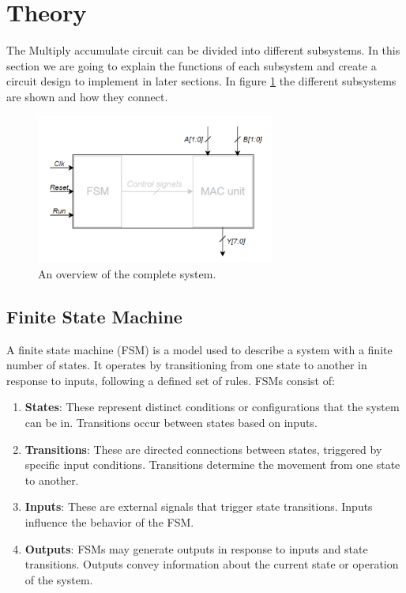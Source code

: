 \newpage
\section{Theory}
\label{sec:theory}

The Multiply accumulate circuit can be divided into different subsystems. In this section we are going to explain the functions of each subsystem and create a circuit design to implement in later sections. In figure \ref{fig:blokk} the different subsystems are shown and how they connect. 

\begin{figure}[H]
    \centering
    \includegraphics[width=0.7\textwidth]{Figures/Blokk.png}
    \caption{An overview of the complete system.}
    \label{fig:blokk}
\end{figure}


\subsection{Finite State Machine}
\label{subsec:fsm_theory}

A finite state machine (FSM) is a model used to describe a system with a finite number of states. It operates by transitioning from one state to another in response to inputs, following a defined set of rules. FSMs consist of:

\begin{enumerate}
    \item \textbf{States}: These represent distinct conditions or configurations that the system can be in. Transitions occur between states based on inputs.
    
    \item \textbf{Transitions}: These are directed connections between states, triggered by specific input conditions. Transitions determine the movement from one state to another.
    
    \item \textbf{Inputs}: These are external signals that trigger state transitions. Inputs influence the behavior of the FSM.
    
    \item \textbf{Outputs}: FSMs may generate outputs in response to inputs and state transitions. Outputs convey information about the current state or operation of the system.
\end{enumerate}

